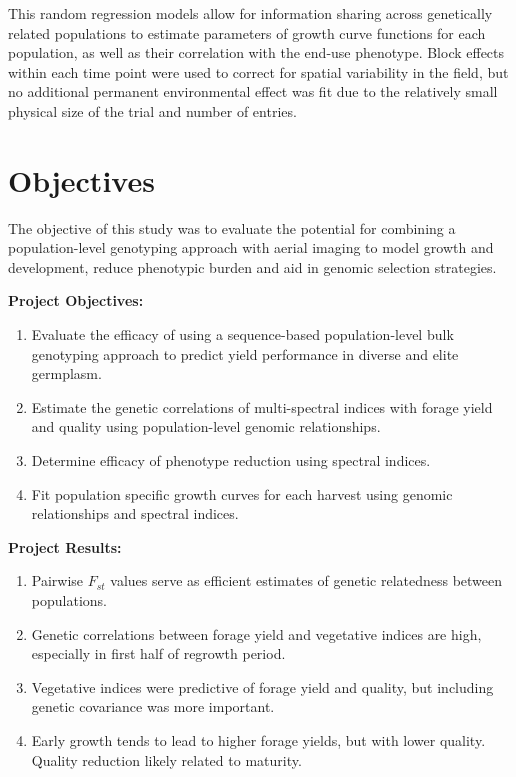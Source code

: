 \documentclass[12pt, letterpaper]{article}
\begin{document}
This random regression models allow for information sharing across genetically related populations to estimate parameters of growth curve functions for each population, as well as their correlation with the end-use phenotype. Block effects within each time point were used to correct for spatial variability in the field, but no additional permanent environmental effect was fit due to the relatively small physical size of the trial and number of entries. 


\section*{Objectives}

The objective of this study was to evaluate the potential for combining a population-level genotyping approach with aerial imaging to model growth and development, reduce phenotypic burden and aid in genomic selection strategies. 

\noindent%
\begin{minipage}[h]{.475\textwidth}
\textbf{Project Objectives:}
\begin{enumerate}
	  \setlength\itemsep{0.2em}
	\item Evaluate the efficacy of using a sequence-based population-level bulk genotyping approach to predict yield performance in diverse and elite germplasm.%
	\item Estimate the genetic correlations of multi-spectral indices with forage yield and quality using population-level genomic relationships.%
	\item Determine efficacy of phenotype reduction using spectral indices.%
	\item Fit population specific growth curves for each harvest using genomic relationships and spectral indices.%
\end{enumerate}%
\end{minipage}%
\begin{minipage}[h]{.05\textwidth}
\quad
\end{minipage}
\begin{minipage}[h]{.475\textwidth}

\textbf{Project Results:}
\begin{enumerate}
	  \setlength\itemsep{0.2em}
	\item Pairwise $F_{st}$ values serve as efficient estimates of genetic relatedness between populations.%
	\item Genetic correlations between forage yield and vegetative indices are high, especially in first half of regrowth period.%
	\item Vegetative indices were predictive of forage yield and quality, but including genetic covariance was more important.%
	\item Early growth tends to lead to higher forage yields, but with lower quality. Quality reduction likely related to maturity.%
\end{enumerate}%
\end{minipage}
\end{document}
